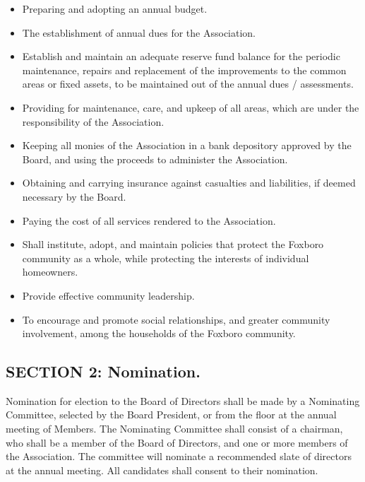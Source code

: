 \begin{itemize}
\item Preparing and adopting an annual budget.

\item The establishment of annual dues for the Association.

\item Establish and maintain an adequate reserve fund balance for the
periodic maintenance, repairs and replacement of the improvements to
the common areas or fixed assets, to be maintained out of the annual
dues / assessments.

\item Providing for maintenance, care, and upkeep of all areas, which
are under the responsibility of the Association.

\item Keeping all monies of the Association in a bank depository approved
by the Board, and using the proceeds to administer the Association.

\item Obtaining and carrying insurance against casualties and liabilities,
if deemed necessary by the Board.

\item Paying the cost of all services rendered to the Association.

\item Shall institute, adopt, and maintain policies that protect
the Foxboro community as a whole, while protecting the interests of
individual homeowners.

\item Provide effective community leadership.

\item To encourage and promote social relationships, and greater community
involvement, among the households of the Foxboro community.

\end{itemize}


\subsection{SECTION 2: Nomination.}
Nomination for election to the Board of Directors shall be made by
a Nominating Committee, selected by the Board President, or from the
floor at the annual meeting of Members. The Nominating Committee shall
consist of a chairman, who shall be a member of the Board of Directors,
and one or more members of the Association. The committee will nominate
a recommended slate of directors at the annual meeting. All candidates
shall consent to their nomination.

